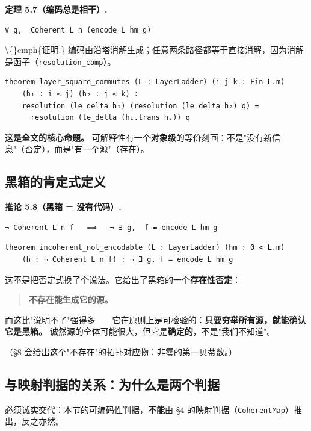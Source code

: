 \documentclass[11pt,a4paper]{ctexart}
\begin{document}
\textbf{定理 5.7（编码总是相干）.}

\begin{lstlisting}
∀ g,  Coherent L n (encode L hm g)
\end{lstlisting}

\textbackslash\{\}emph\{证明.\} 编码由沿塔消解生成；任意两条路径都等于直接消解，因为消解是函子（\texttt{resolution\_comp}）。

\begin{lstlisting}
theorem layer_square_commutes (L : LayerLadder) (i j k : Fin L.m)
    (h₁ : i ≤ j) (h₂ : j ≤ k) :
    resolution (le_delta h₁) (resolution (le_delta h₂) q) =
      resolution (le_delta (h₁.trans h₂)) q
\end{lstlisting}

\textbf{这是全文的核心命题。} 可解释性有一个\textbf{对象级}的等价刻画：不是"没有新信息"（否定），而是"有一个源"（存在）。

\subsection{黑箱的肯定式定义}

\textbf{推论 5.8（黑箱 = 没有代码）.}

\begin{lstlisting}
¬ Coherent L n f   ⟹   ¬ ∃ g,  f = encode L hm g
\end{lstlisting}

\begin{lstlisting}
theorem incoherent_not_encodable (L : LayerLadder) (hm : 0 < L.m)
    (h : ¬ Coherent L n f) : ¬ ∃ g, f = encode L hm g
\end{lstlisting}

这不是把否定式换了个说法。它给出了黑箱的一个\textbf{存在性否定}：

\begin{quote}
\textbf{不存在能生成它的源。}
\end{quote}

而这比"说明不了"强得多——它在原则上是可检验的：\textbf{只要穷举所有源，就能确认它是黑箱。} 诚然源的全体可能很大，但它是\textbf{确定的}，不是"我们不知道"。

（§8 会给出这个"不存在"的拓扑对应物：非零的第一贝蒂数。）

\subsection{与映射判据的关系：为什么是两个判据}

必须诚实交代：本节的可编码性判据，\textbf{不能}由 §4 的映射判据（\texttt{CoherentMap}）推出，反之亦然。
\end{document}
